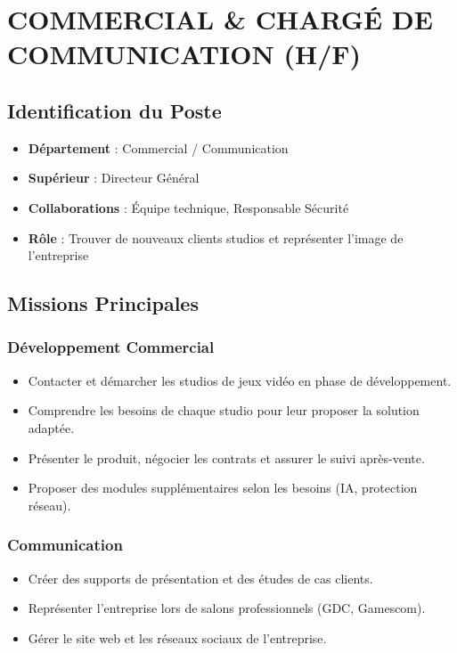 \documentclass[12pt,a4paper]{article}
\begin{document}
\section{COMMERCIAL \& CHARGÉ DE COMMUNICATION (H/F)}

\subsection{Identification du Poste}
\begin{itemize}[label=\textbullet]
    \item \textbf{Département} : Commercial / Communication
    \item \textbf{Supérieur} : Directeur Général
    \item \textbf{Collaborations} : Équipe technique, Responsable Sécurité
    \item \textbf{Rôle} : Trouver de nouveaux clients studios et représenter l'image de l'entreprise
\end{itemize}

\subsection{Missions Principales}

\subsubsection{Développement Commercial}
\begin{itemize}[label=\textbullet]
    \item Contacter et démarcher les studios de jeux vidéo en phase de développement.
    \item Comprendre les besoins de chaque studio pour leur proposer la solution adaptée.
    \item Présenter le produit, négocier les contrats et assurer le suivi après-vente.
    \item Proposer des modules supplémentaires selon les besoins (IA, protection réseau).
\end{itemize}

\subsubsection{Communication}
\begin{itemize}[label=\textbullet]
    \item Créer des supports de présentation et des études de cas clients.
    \item Représenter l'entreprise lors de salons professionnels (GDC, Gamescom).
    \item Gérer le site web et les réseaux sociaux de l'entreprise.
\end{itemize}
\end{document}
